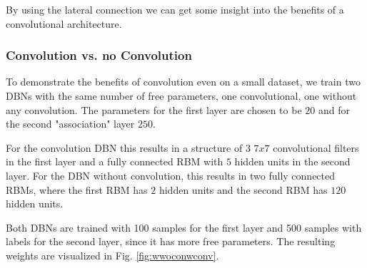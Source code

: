 By using the lateral connection we can get some insight into the benefits of a convolutional architecture.

\subsubsection{Convolution vs. no Convolution} \label{c:convvsnoconvexp}

To demonstrate the benefits of convolution even on a small dataset, we train two DBNs with the same number of free parameters, one convolutional, one without any convolution.
The parameters for the first layer are chosen to be $20$ and for the second "association" layer $250$.

For the convolution DBN this results in a structure of $3$ $7x7$ convolutional filters in the first layer and a fully connected RBM with $5$ hidden units in the second layer.
For the DBN without convolution, this results in two fully connected RBMs, where the first RBM has $2$ hidden units and the second RBM has $120$ hidden units.

Both DBNs are trained with 100 samples for the first layer and 500 samples with labels for the second layer, since it has more free parameters.
The resulting weights are visualized in Fig. \ref{fig:wwoconwconv}.

